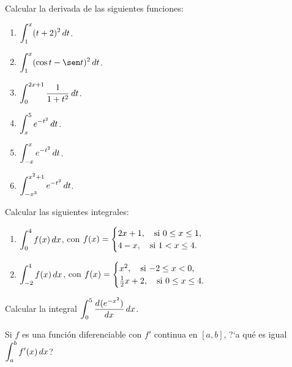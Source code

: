 \item Calcular la derivada de las siguientes funciones:
\begin{multicols}{2}
  \begin{enumerate}
    \item $\D \int_1^x (t+2)^2 \dt$.
    \item $\D \int_1^x (\cos t-\sen t)^2 \dt$.
    \item $\D \int_0^{2x+1} \frac{1}{1+t^2} \dt$.
    \item $\D \int_x^5 e^{-t^2} \dt$.
    \item $\D \int_{-x}^x e^{-t^2} \dt$.
    \item $\D \int_{-x^3}^{x^2+1} e^{-t^2} \dt$.
  \end{enumerate}
\end{multicols}

\item Calcular las siguientes integrales:
  \begin{enumerate}
    \item $\D \int_0^4 f(x)\dx$, con 
    $\D f(x)=\begin{cases}
      2x+1, \quad \text{si $0\le x \le 1$},
      \\
      4-x, \quad \text{si $1<x\le 4$}.
    \end{cases}
      $
      \item $\D \int_{-2}^4 f(x)\dx$, con 
          $\D f(x)=\begin{cases}
        x^2, \quad \text{si $-2\le x < 0$},
        \\
        \frac12 x+2, \quad \text{si $0\le x\le 4$}.
          \end{cases}
        $
  \end{enumerate}

\item Calcular la integral $\D\int_0^{5} \dd[]{(e^{-x^2})}{x}\dx$.

\item Si $f$ es una función diferenciable con $f'$ continua en $[a,b]$, ?`a qué es igual $\D\int_a^b f'(x) \dx$?